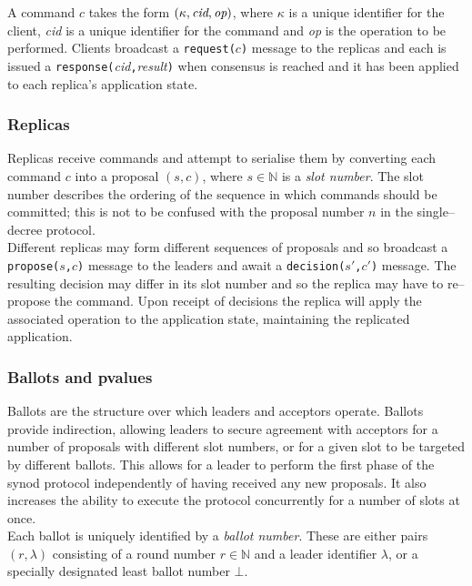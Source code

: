 A command $c$ takes the form $\left( \kappa, \mathrm{\emph{cid}}, \mathrm{\emph{op}} \right)$, where $\kappa$ is a unique identifier for the client, \emph{cid} is a unique identifier for the command and \emph{op} is the operation to be performed. Clients broadcast a \texttt{request($c$)} message to the replicas and each is issued a \texttt{response(}\emph{cid}\texttt{,}\emph{result}\texttt{)} when consensus is reached and it has been applied to each replica's application state.

\subsubsection{Replicas}

Replicas receive commands and attempt to serialise them by converting each command $c$ into a proposal $\left(s,c\right)$, where $s \in \mathbb{N}$ is a \emph{slot number}. The slot number describes the ordering of the sequence in which commands should be committed; this is not to be confused with the proposal number $n$ in the single--decree protocol. \\

Different replicas may form different sequences of proposals and so broadcast a \texttt{propose($s$,$c$)} message to the leaders and await a \texttt{decision($s'$,$c'$)} message. The resulting decision may differ in its slot number and so the replica may have to re--propose the command. Upon receipt of decisions the replica will apply the associated operation to the application state, maintaining the replicated application.

\subsubsection{Ballots and pvalues}

Ballots are the structure over which leaders and acceptors operate. Ballots provide indirection, allowing leaders to secure agreement with acceptors for a number of proposals with different slot numbers, or for a given slot to be targeted by different ballots. This allows for a leader to perform the first phase of the synod protocol independently of having received any new proposals. It also increases the ability to execute the protocol concurrently for a number of slots at once. \\

Each ballot is uniquely identified by a \emph{ballot number}. These are either pairs $\left(r, \lambda\right)$ consisting of a round number $r \in \mathbb{N}$ and a leader identifier $\lambda$, or a specially designated least ballot number $\bot$. \\

